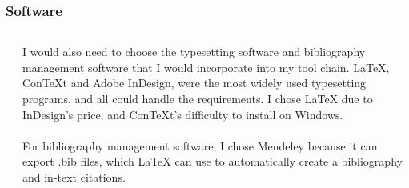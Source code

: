 \documentclass[aspectratio = 169]{beamer}
\begin{document}
\begin{frame}
\label{software}
\frametitle{Software}
\begin{columns}


\hyperlink{introI}{} \newline
\hyperlink{introII}{} \newline 
\hyperlink{scoping}{} \newline
\hyperlink{elaboration}{} \newline  
\hyperlink{software}{} \newline 
\hyperlink{toolchain}{} \newline 
\hyperlink{learning}{} \newline 
\hyperlink{problems}{} \newline 
\hyperlink{results}{} \newline
\hyperlink{exampleI}{} \newline 
\hyperlink{exampleII}{}  



I would also need to choose the typesetting software and bibliography management software that I would incorporate into my tool chain. LaTeX, ConTeXt and Adobe InDesign\texttrademark, were the most widely used typesetting programs, and all could handle the requirements. I chose LaTeX due to InDesign's price, and ConTeXt's difficulty to install on Windows.
\\~\\
For bibliography management software, I chose Mendeley because it can export .bib files, which LaTeX can use to automatically create a bibliography and in-text citations.

\end{columns}
\end{frame}



\end{document}
